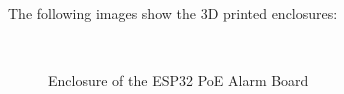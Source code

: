\documentclass[a4paper,12pt]{article}
\begin{document}
The following images show the 3D printed enclosures:
\begin{figure}[H]
    \qquad
    \\
    \qquad
    \caption{Enclosure of the ESP32 PoE Alarm Board}
    \label{fig:enclosure}
\end{figure}

\newpage
\end{document}
